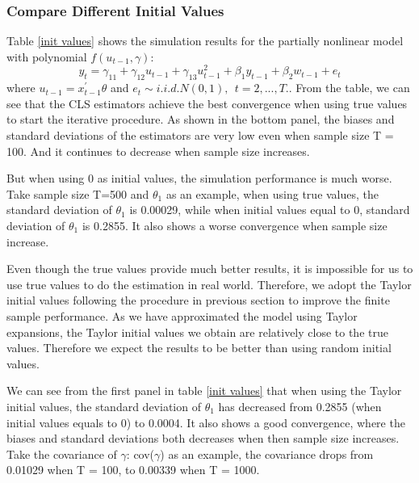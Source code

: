 \documentclass[a4paper,12pt,times,numbered,print,index]{report}
\numberwithin{equation}{section}
\begin{document}
\subsubsection{Compare Different Initial Values}

Table \ref{init values} shows the simulation results for the partially nonlinear model with polynomial $f\left( u_{t-1},\gamma\right)$:
$$
y_{t}  = \gamma_{11}+ \gamma_{12}{u}_{t-1}+\gamma_{13}{u}_{t-1}^{2} +\beta_{1}y_{t-1} + \beta_2w_{t-1} +e_t
$$
where ${u}_{t-1} = x^{\prime}_{t-1}\theta$ and $e_{t}\sim i.i.d.N\left( 0,1\right) ,\ \ t=2,...,T$.. From the table, we can see that the CLS estimators achieve the best convergence when using true values to start the iterative procedure. As shown in the bottom panel, the biases and standard deviations of the estimators are very low even when sample size T = 100. And it continues to decrease when sample size increases.

But when using 0 as initial values, the simulation performance is much worse. Take sample size T=500 and $\theta_1$ as an example, when using true values, the standard deviation of $\theta_1$ is 0.00029, while when initial values equal to 0, standard deviation of $\theta_1$ is 0.2855.  It also shows a worse convergence when sample size increase.

Even though the true values provide much better results, it is impossible for us to use true values to do the estimation in real world. Therefore, we adopt the Taylor initial values following the procedure in previous section to improve the finite sample performance. As we have approximated the model using Taylor expansions, the Taylor initial values we obtain are relatively close to the true values. Therefore we expect the results to be better than using random initial values. 

We can see from the first panel in table \ref{init values} that when using the Taylor initial values, the standard deviation of $\theta_1$ has decreased from 0.2855 (when initial values equals to 0) to 0.0004. It also shows a good convergence, where the biases and standard deviations both decreases when then sample size increases. Take the covariance of $\gamma$: cov($\gamma$) as an example, the covariance drops from 0.01029 when T = 100, to 0.00339 when T = 1000. 
\end{document}

